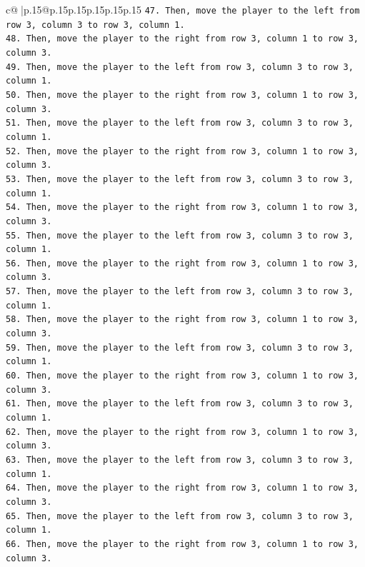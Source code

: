 \documentclass{article}
\begin{document}
{\begin{supertabular}{c@{$\;$}|p{.15\linewidth}@{}p{.15\linewidth}p{.15\linewidth}p{.15\linewidth}p{.15\linewidth}p{.15\linewidth}}
{{{\texttt{47. Then, move the player to the left from row 3, column 3 to row 3, column 1.} \\
\texttt{48. Then, move the player to the right from row 3, column 1 to row 3, column 3.} \\
\texttt{49. Then, move the player to the left from row 3, column 3 to row 3, column 1.} \\
\texttt{50. Then, move the player to the right from row 3, column 1 to row 3, column 3.} \\
\texttt{51. Then, move the player to the left from row 3, column 3 to row 3, column 1.} \\
\texttt{52. Then, move the player to the right from row 3, column 1 to row 3, column 3.} \\
\texttt{53. Then, move the player to the left from row 3, column 3 to row 3, column 1.} \\
\texttt{54. Then, move the player to the right from row 3, column 1 to row 3, column 3.} \\
\texttt{55. Then, move the player to the left from row 3, column 3 to row 3, column 1.} \\
\texttt{56. Then, move the player to the right from row 3, column 1 to row 3, column 3.} \\
\texttt{57. Then, move the player to the left from row 3, column 3 to row 3, column 1.} \\
\texttt{58. Then, move the player to the right from row 3, column 1 to row 3, column 3.} \\
\texttt{59. Then, move the player to the left from row 3, column 3 to row 3, column 1.} \\
\texttt{60. Then, move the player to the right from row 3, column 1 to row 3, column 3.} \\
\texttt{61. Then, move the player to the left from row 3, column 3 to row 3, column 1.} \\
\texttt{62. Then, move the player to the right from row 3, column 1 to row 3, column 3.} \\
\texttt{63. Then, move the player to the left from row 3, column 3 to row 3, column 1.} \\
\texttt{64. Then, move the player to the right from row 3, column 1 to row 3, column 3.} \\
\texttt{65. Then, move the player to the left from row 3, column 3 to row 3, column 1.} \\
\texttt{66. Then, move the player to the right from row 3, column 1 to row 3, column 3.} \\
}}}
\end{supertabular}}
\end{document}
